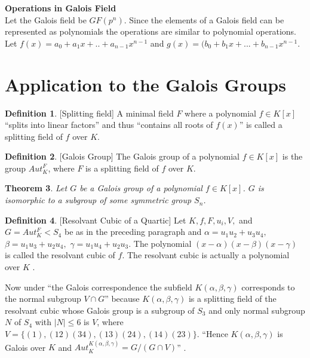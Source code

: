 \documentclass[11pt]{amsart}
\theoremstyle{plain}
\newtheorem{theorem}{Theorem}[section]
\theoremstyle{definition}
\newtheorem{definition}[theorem]{Definition}
\numberwithin{equation}{section}
\begin{document}
\textbf{Operations in Galois Field}\\
Let the Galois field be \(GF(p^n)\). Since the elements of a Galois field can be represented as polynomials the operations are similar to polynomial operations. Let \(f(x)=a_0+a_1x+..+a_{n-1}x^{n-1}\) and \(g(x)=(b_0+b_1x+...+b_{n-1}x^{n-1}\).


\vspace{9mm}
\section{Application to the Galois Groups}
\begin{definition} \cite{hunger} [Splitting field]
  A minimal field \(F\) where a polynomial \(f \in K[x]\) ``splits into linear factors'' and thus ``contains all roots of \(f(x)\)'' is called a splitting field of \(f\) over \(K\).
\end{definition}

\vspace{2mm}
\begin{definition} \cite{hunger} [Galois Group]
  The Galois group of a polynomial \(f \in K[x]\) is the group \(Aut_K^F\), where \(F\) is a splitting field of \(f\) over \(K\).
\end{definition}

\begin{theorem} \cite{hunger}
  Let \(G\) be a Galois group of a polynomial \(f \in K[x]\). \(G\) is isomorphic to a subgroup of some symmetric group \(S_n\).
\end{theorem}

\vspace{5mm}
\begin{definition} \cite{hunger} [Resolvant Cubic of a Quartic]
Let \(K, f, F, u_i, V,\) and \(G=Aut_K^F<S_4\) be as in the preceding paragraph and \(\alpha=u_1u_2+u_3u_4,\) \(\beta=u_1u_3+u_2u_4,\) \(\gamma=u_1u_4+u_2u_3\).
The polynomial \( (x- \alpha)(x- \beta)(x- \gamma) \) is called the resolvant cubic of \(f\). The resolvant cubic is actually a polynomial over \(K\) \cite{hunger}.
\end{definition}
\vspace{-4mm}
Now under ``the Galois correspondence the subfield \(K(\alpha, \beta, \gamma)\) corresponds to the normal subgroup \(V \cap G\)'' \cite{hunger} because \(K(\alpha,\beta,\gamma)\) is a splitting field of the resolvant cubic whose Galois group is a subgroup of \(S_3\) and only normal subgroup \(N\) of \(S_4\) with \(|N| \leq 6\) is \(V\), where \(V=\{(1),(12)(34),(13)(24),(14)(23)\}\). ``Hence \(K(\alpha, \beta, \gamma)\) is Galois over \(K\) and \(Aut_K^{K(\alpha, \beta, \gamma)} = G/(G \cap V)\)'' \cite{hunger}.
\end{document}
